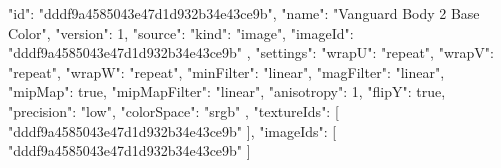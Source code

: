 {
  "id": "dddf9a4585043e47d1d932b34e43ce9b",
  "name": "Vanguard Body 2 Base Color",
  "version": 1,
  "source": {
    "kind": "image",
    "imageId": "dddf9a4585043e47d1d932b34e43ce9b"
  },
  "settings": {
    "wrapU": "repeat",
    "wrapV": "repeat",
    "wrapW": "repeat",
    "minFilter": "linear",
    "magFilter": "linear",
    "mipMap": true,
    "mipMapFilter": "linear",
    "anisotropy": 1,
    "flipY": true,
    "precision": "low",
    "colorSpace": "srgb"
  },
  "textureIds": [
    "dddf9a4585043e47d1d932b34e43ce9b"
  ],
  "imageIds": [
    "dddf9a4585043e47d1d932b34e43ce9b"
  ]
}
